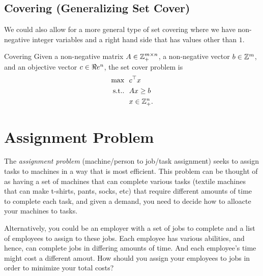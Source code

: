 \subsection{Covering (Generalizing Set Cover)}
We could also allow for a more general type of set covering where we have non-negative integer variables and a right hand side that has values other than $1$.
\begin{general}{Covering}{\npcomplete}
\label{general:covering}
Given a non-negative matrix $A \in {\mathbb{Z}}_+^{m \times n}$, a non-negative vector $b \in {\mathbb{Z}}^m$, and an objective vector $c \in \Re e^n$, the set cover problem is
\begin{equation}
\begin{split}
\max \ \ & c^\top x\\
\mbox{s.t.}. \ \ & Ax \geq b \\
& x \in{\mathbb{Z}}^n_+.
\end{split}
\end{equation}
\end{general}

%
%




\section{Assignment Problem}
\todoSection{}
The \emph{assignment problem} (machine/person to job/task assignment) seeks to assign tasks to machines in a way that is most efficient.   This problem can be thought of as having a set of machines that can complete various tasks (textile machines that can make t-shirts, pants, socks, etc) that require different amounts of time to complete each task, and given a demand, you need to decide how to alloacte your machines to tasks.

Alternatively, you could be an employer with a set of jobs to complete and a list of employees to assign to these jobs.  Each employee has various abilities, and hence, can complete jobs in differing amounts of time.  And each employee's time might cost a different amout.  How should you assign your employees to jobs in order to minimize your total costs?


